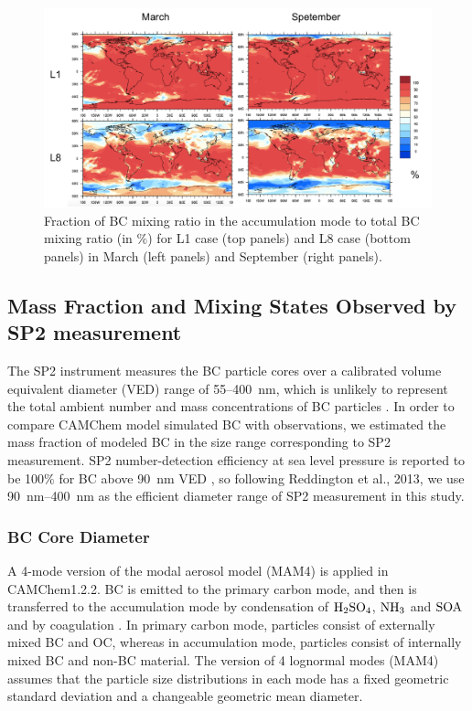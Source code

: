 \documentclass[12pt]{article}
\begin{document}
	\begin{figure}[H] 
		\begin{center}
			\includegraphics[width = 1\textwidth]{Figure19}
			\caption[]{\label{fig_P19} Fraction of BC mixing ratio in the accumulation mode to total BC mixing ratio (in $\%$) for L1 case (top panels) and L8 case (bottom panels) in March (left panels) and September (right panels).}
		\end{center}
	\end{figure}

	\subsection{Mass Fraction and Mixing States Observed by SP2 measurement}
	The SP2 instrument measures the BC particle cores over a calibrated volume equivalent diameter (VED) range of 55--400~nm, which is unlikely to represent the total
	ambient number and mass concentrations of BC particles \citep{Reddington2013}. In order to compare CAMChem model simulated BC with observations, we estimated the mass fraction of modeled BC in the size range corresponding to SP2 measurement. SP2 number-detection efficiency at sea level pressure is reported to be 100$\%$ for BC above 90~nm VED \citep{Schwarz2010a}, so following Reddington et al., 2013, we use 90~nm--400~nm as the efficient diameter range of SP2 measurement in this study.
	
	\subsubsection{BC Core Diameter} 
	A 4-mode version of the modal aerosol model (MAM4) is applied in
	CAMChem1.2.2. BC is emitted to the primary carbon mode, and then is
	transferred to the accumulation mode by condensation of
	$\rm{H_2SO_4}$, $\rm{NH_3}$ and $\rm{SOA}$ and by coagulation \citep{Liu2012}. In primary carbon mode, particles consist of externally
	mixed BC and OC, whereas in accumulation mode, particles consist of
	internally mixed BC and non-BC material. The version of 4 lognormal modes (MAM4) assumes that the particle size distributions in each mode has a fixed geometric standard deviation and a changeable geometric mean diameter.
	
\end{document}
